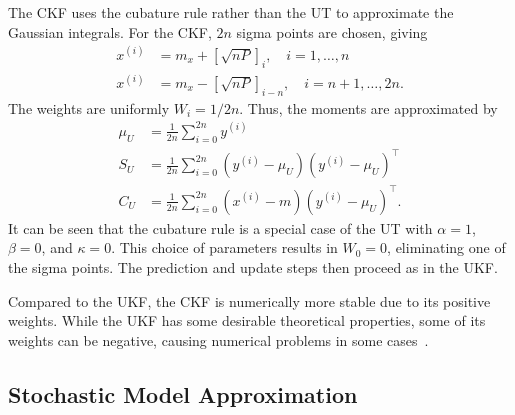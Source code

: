 \documentclass[../zhang_thesis.tex]{subfiles}
\begin{document}
The CKF uses the cubature rule rather than the UT to approximate the Gaussian integrals. For the CKF, $2n$ sigma points are chosen, giving~\cite{arasaratnam10}
\begin{align}
    x^{(i)} & = m_x + \left[ \sqrt{nP} \right]_i, \quad i=1,\dots,n \\
    x^{(i)} & = m_x - \left[ \sqrt{nP} \right]_{i-n}, \quad i=n+1,\dots,2n.
\end{align}
The weights are uniformly $W_i=1/2n$. Thus, the moments are approximated by
\begin{align}
    \mu_U & = \frac{1}{2n} \sum_{i=0}^{2n} y^{(i)} \\
    S_U & = \frac{1}{2n} \sum_{i=0}^{2n} ( y^{(i)} - \mu_U ) ( y^{(i)} - \mu_U )^\top \\
    C_U & = \frac{1}{2n} \sum_{i=0}^{2n} ( x^{(i)} - m ) ( y^{(i)} - \mu_U )^\top.
\end{align}
It can be seen that the cubature rule is a special case of the UT with $\alpha=1$, $\beta=0$, and $\kappa=0$. This choice of parameters results in $W_0=0$, eliminating one of the sigma points. The prediction and update steps then proceed as in the UKF.

Compared to the UKF, the CKF is numerically more stable due to its positive weights. While the UKF has some desirable theoretical properties, some of its weights can be negative, causing numerical problems in some cases~\cite{sarkka12}.

\subsection{Stochastic Model Approximation}
\end{document}
